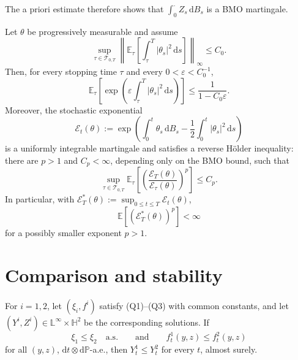 The a priori estimate therefore shows that
$\int_0^\cdot Z_s\,\mathrm dB_s$ is a BMO martingale.

\begin{thm}
Let $\theta$ be progressively measurable and assume
\[
  \sup_{\tau\in\mathcal T_{0,T}}
  \left\|
    \mathbb E_\tau\!\left[
      \int_\tau^T|\theta_s|^2\,\mathrm ds
    \right]
  \right\|_\infty
  \le C_0.
\]
Then, for every stopping time $\tau$ and every
$0<\varepsilon<C_0^{-1}$,
\[
  \mathbb E_\tau\!\left[
    \exp\!\left(
      \varepsilon\int_\tau^T|\theta_s|^2\,\mathrm ds
    \right)
  \right]
  \le\frac{1}{1-C_0\varepsilon}.
\]
Moreover, the stochastic exponential
\[
  \mathcal E_t(\theta)
  :=\exp\!\left(
    \int_0^t\theta_s\,\mathrm dB_s
    -\frac12\int_0^t|\theta_s|^2\,\mathrm ds
  \right)
\]
is a uniformly integrable martingale and satisfies a reverse H\"older
inequality: there are $p>1$ and $C_p<\infty$, depending only on the BMO
bound, such that
\[
  \sup_{\tau\in\mathcal T_{0,T}}
  \mathbb E_\tau\!\left[
    \left(\frac{\mathcal E_T(\theta)}{\mathcal E_\tau(\theta)}\right)^p
  \right]
  \le C_p.
\]
In particular, with
$\mathcal E_T^*(\theta):=\sup_{0\le t\le T}\mathcal E_t(\theta)$,
\[
  \mathbb E[(\mathcal E_T^*(\theta))^p]<\infty
\]
for a possibly smaller exponent $p>1$.
\end{thm}

\section{Comparison and stability}

\begin{thm}[Comparison]
For $i=1,2$, let $(\xi_i,f^i)$ satisfy \textup{(Q1)}--\textup{(Q3)}
with common constants, and let
$(Y^i,Z^i)\in\mathbb L^\infty\times\mathbb H^2$ be the corresponding
solutions.  If
\[
  \xi_1\le\xi_2\quad\text{a.s.}
  \qquad\text{and}\qquad
  f_t^1(y,z)\le f_t^2(y,z)
\]
for all $(y,z)$, $\mathrm dt\otimes\mathrm d\mathbb P$-a.e., then
$Y_t^1\le Y_t^2$ for every $t$, almost surely.
\end{thm}

